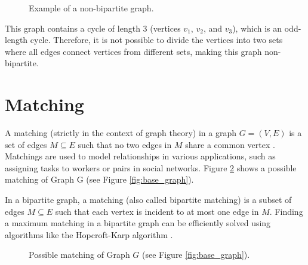         \begin{figure}[!ht]
            \centering
            \caption{Example of a non-bipartite graph.} 
            \label{fig:non_bipartite_graph}
        \end{figure}
        
        This graph contains a cycle of length 3 (vertices \(v_1\), \(v_2\), and \(v_3\)), which is an odd-length cycle. Therefore, it is not possible to divide the vertices into two sets where all edges connect vertices from different sets, making this graph non-bipartite.
        
        \section{Matching}

            A matching (strictly in the context of graph theory) in a graph \( G = (V, E) \) is a set of edges \( M \subseteq E \) such that no two edges in \( M \) share a common vertex \cite{cormen, bondy1976graph}. Matchings are used to model relationships in various applications, such as assigning tasks to workers or pairs in social networks. Figure \ref{fig:possible_matching} shows a possible matching of Graph G (see Figure \ref{fig:base_graph}).
            
            In a bipartite graph, a matching (also called bipartite matching) is a subset of edges \( M \subseteq E \) such that each vertex is incident to at most one edge in \( M \). Finding a maximum matching in a bipartite graph can be efficiently solved using algorithms like the Hopcroft-Karp algorithm \cite{west2001introduction, diestel2017graph}.


            \begin{figure}[!ht]
                \centering
                \caption{Possible matching of Graph $G$ (see Figure \ref{fig:base_graph}).}
                \label{fig:possible_matching}
            \end{figure}
            
